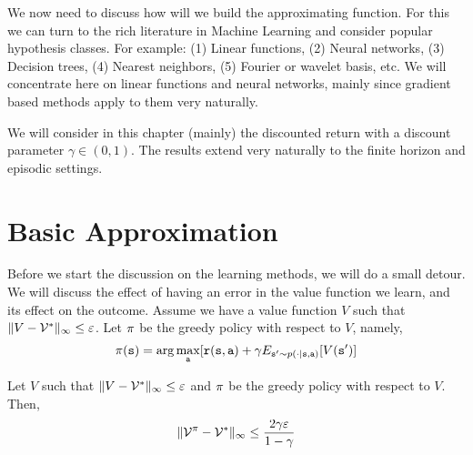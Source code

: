 We now need to discuss how will we build the approximating function.
For this we can turn to the rich literature in Machine Learning and
consider popular hypothesis classes. For example: (1) Linear
functions, (2) Neural networks, (3) Decision trees, (4) Nearest
neighbors, (5) Fourier or wavelet basis, etc. We will concentrate
here on linear functions and neural networks, mainly since gradient
based methods apply to them very naturally.

We will consider in this chapter (mainly) the discounted return with
a discount parameter $\gamma\in(0,1)$. The results extend very
naturally to the finite horizon and episodic settings.


\section{Basic Approximation}

Before we start the discussion on the learning methods, we will do a
small detour. We will discuss the effect of having an error in the
value function we learn, and its effect on the outcome. Assume we
have a value function $V$ such that $\|V-\mathcal{V}^*\|_\infty\leq
\varepsilon$. Let $\pi$ be the greedy policy with respect to
$V$, namely,
\[
\pi({\tt s})=\arg\max_{\tt a} [{\tt r}({\tt s},{\tt a})+\gamma
E_{{\tt s}'\sim p(\cdot|{\tt s},{\tt a})}[V({\tt s}')]
\]


\begin{theorem}
Let $V$ such that $\|V-\mathcal{V}^*\|_\infty\leq \varepsilon$ and
$\pi$ be the greedy policy with respect to $V$. Then,
\[
\|\mathcal{V}^\pi-\mathcal{V}^*\|_\infty\leq\frac{2\gamma\varepsilon}{1-\gamma}
\]
\end{theorem}

